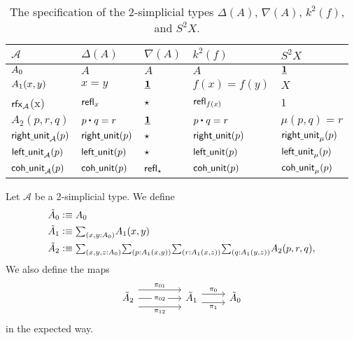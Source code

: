 \begin{table}
\centering
\caption{\label{table:stype_eg}The specification of the $2$-simplicial types $\Delta(A)$, $\nabla(A)$, $k^2(f)$, and $S^2 X$.}
\begin{tabular}{lllll}
\toprule
$\mathcal{A}$ & $\Delta(A)$ & $\nabla(A)$ & $k^2(f)$ & $S^2X$ \\
\midrule
$\pts{A}$ & $A$ & $A$ & $A$ & $\underline{\mathbf{1}}$  \\
$\edg{A}(x,y)$ &  $x=y$ & $\underline{\mathbf{1}}$ & $f(x)=f(y)$ & $X$ \\
$\rfx{\mathcal{A}}$(x) & $\mathsf{refl}_{x}$ & $\star$ & $\mathsf{refl}_{f(x)}$ & $1$  \\
$A_2(p,r,q)$ & $\ct{p}{q}=r$ & $\underline{\mathbf{1}}$ & $\ct{p}{q}=r$ & $\mu(p,q)=r$ \\
$\mathsf{right\underline{\ }{}unit}_{\mathcal{A}}(p)$ & $\mathsf{right\underline{\ }{}unit}(p)$ & $\star$ & $\mathsf{right\underline{\ }{}unit}(p)$ & $\mathsf{right\underline{\ }{}unit}_{\mu}(p)$ \\ 
$\mathsf{left\underline{\ }{}unit}_{\mathcal{A}}(p)$ & $\mathsf{left\underline{\ }{}unit}(p)$ & $\star$ & $\mathsf{left\underline{\ }{}unit}(p)$ & $\mathsf{left\underline{\ }{}unit}_{\mu}(p)$ \\
$\mathsf{coh\underline{\ }{}unit}_{\mathcal{A}}(p)$ & $\mathsf{coh\underline{\ }{}unit}(p)$ & $\mathsf{refl}_{\star}$ & $\mathsf{coh\underline{\ }{}unit}(p)$ & $\mathsf{coh\underline{\ }{}unit}_{\mu}(p)$ \\
\bottomrule
\end{tabular}
\end{table}

\begin{defn}
Let $\mathcal{A}$ be a $2$-simplicial type. We define
\begin{align*}
\tilde{A}_0 & \defeq A_0 \\
\tilde{A}_1 & \defeq \sm{x,y:A_0} A_1(x,y) \\
\tilde{A}_2 & \defeq \sm{x,y,z:A_0}{p:A_1(x,y)}{r:A_1(x,z)}{q:A_1(y,z)} A_2(p,r,q),
\end{align*}
We also define the maps
\begin{equation*}
\begin{tikzcd}
\tilde{A}_2 \arrow[r,yshift=2ex,"\pi_{01}"] \arrow[r,"\pi_{02}" description] \arrow[r,yshift=-2ex,swap,"\pi_{12}"] &[2em] \tilde{A}_1 \arrow[r,yshift=1ex,"\pi_0"] \arrow[r,yshift=-1ex,swap,"\pi_1"] & \tilde{A}_0
\end{tikzcd}
\end{equation*}
in the expected way.
\end{defn}

